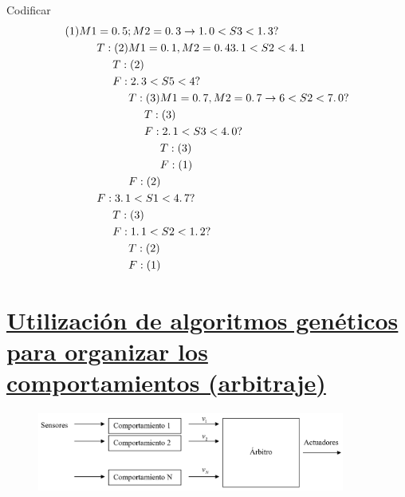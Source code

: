 \begin{ejemplo}
	Codificar 
	\begin{equation}
	\begin{aligned}
		(1) M1 & = 0\ldotp 5; M2 = 0\ldotp3 \rightarrow 1 \ldotp 0 < S3 < 1\ldotp3 ? \\
		& T: (2) M1 = 0\ldotp1, M2 = 0\ldotp4  3\ldotp1 < S2 < 4\ldotp1 \\
		&\hspace{0.5cm} T: (2) \\
		&\hspace{0.5cm} F: 2\ldotp3 < S5 < 4 ? \\
		&\hspace{1cm}T: (3) M1 = 0\ldotp7, M2 = 0\ldotp7 \rightarrow 6 < S2 < 7\ldotp0 ? \\
		& \hspace{1.5cm} T: (3) \\ 
		& \hspace{1.5cm}F: 2\ldotp1 < S3 < 4\ldotp0 ? \\ 
		& \hspace{2cm}T: (3) \\
		& \hspace{2cm}F: (1) \\
		& \hspace{1cm}F: (2) \\ 
		& F: 3\ldotp1 < S1 < 4\ldotp7 ? \\
		& \hspace{0.5cm} T: (3) \\ 
		& \hspace{0.5cm}F: 1\ldotp1 < S2 < 1\ldotp2 ? \\
		& \hspace{1cm}T: (2) \\
		& \hspace{1cm}F: (1) \\ 
	\end{aligned}
	\end{equation}
\end{ejemplo}


\section{\underline{Utilización de algoritmos genéticos para organizar los comportamientos (arbitraje)}}

\begin{figure}[h!]
	\centering
	\includegraphics[width=0.9\textwidth]{images/img94.png}
	\label{figura94}
\end{figure}

